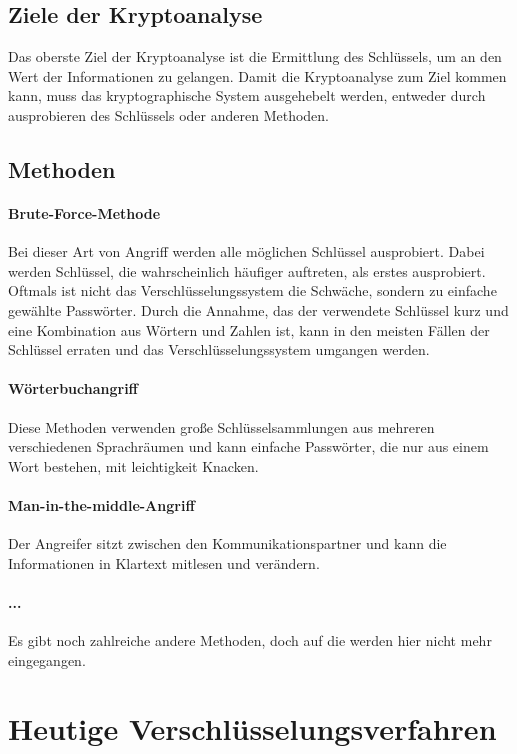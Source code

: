 \documentclass[12pt,a4paper]{report}
\begin{document}
\subsection{Ziele der Kryptoanalyse}

Das oberste Ziel der Kryptoanalyse ist die Ermittlung des Schlüssels, um an den Wert der Informationen zu gelangen. Damit die Kryptoanalyse zum Ziel kommen kann, muss das kryptographische System ausgehebelt werden, entweder durch ausprobieren des Schlüssels oder anderen Methoden.

\subsection{Methoden}

\paragraph{Brute-Force-Methode} Bei dieser Art von Angriff werden alle möglichen Schlüssel ausprobiert. Dabei werden Schlüssel, die wahrscheinlich häufiger auftreten, als erstes ausprobiert. Oftmals ist nicht das Verschlüsselungssystem die Schwäche, sondern zu einfache gewählte Passwörter. Durch die Annahme, das der verwendete Schlüssel kurz und eine Kombination aus Wörtern und Zahlen ist, kann in den meisten Fällen der Schlüssel erraten und das Verschlüsselungssystem umgangen werden.

\paragraph{Wörterbuchangriff} Diese Methoden verwenden große Schlüsselsammlungen aus mehreren verschiedenen Sprachräumen und kann einfache Passwörter, die nur aus einem Wort bestehen, mit leichtigkeit Knacken.

\paragraph{Man-in-the-middle-Angriff} Der Angreifer sitzt zwischen den Kommunikationspartner und kann die Informationen in Klartext mitlesen und verändern.

\paragraph{...} Es gibt noch zahlreiche andere Methoden, doch auf die werden hier nicht mehr eingegangen. 

\section{Heutige Verschlüsselungsverfahren}
\end{document}
